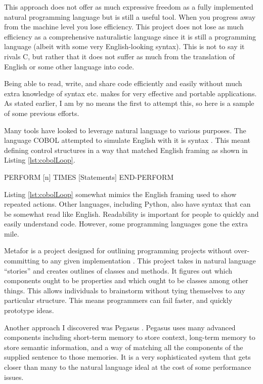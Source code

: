 \documentclass[titlepage]{article}
\newcommand{\lstRef}[1]{Listing \ref{lst:#1}}
\begin{document}
This approach does not offer as much expressive freedom as a fully implemented natural programming language but is still a useful tool. When you progress away from the machine level you lose efficiency. This project does not lose as much efficiency as a comprehensive naturalistic language since it is still a programming language (albeit with some very English-looking syntax). This is not to say it rivals C, but rather that it does not suffer as much from the translation of English or some other language into code.

Being able to read, write, and share code efficiently and easily without much extra knowledge of syntax etc. makes for very effective and portable applications. As stated earlier, I am by no means the first to attempt this, so here is a sample of some previous efforts.

Many tools have looked to leverage natural language to various purposes. The language COBOL attempted to simulate English with it is syntax \cite{Liu2005MetaforVS}. This meant defining control structures in a way that matched English framing as shown in \lstRef{cobolLoop}.

\begin{codeblock}[language=Cobol,caption={Cobol Loop Frame},label={lst:cobolLoop}]
PERFORM [n] TIMES
	[Statements]
END-PERFORM
\end{codeblock}

\lstRef{cobolLoop} somewhat mimics the English framing used to show repeated actions. Other languages, including Python, also have syntax that can be somewhat read like English. Readability is important for people to quickly and easily understand code. However, some programming languages gone the extra mile.

Metafor is a project designed for outlining programming projects without over-committing to any given implementation \cite{Liu2005MetaforVS}. This project takes in natural language “stories” and creates outlines of classes and methods. It figures out which components ought to be properties and which ought to be classes among other things. This allows individuals to brainstorm without tying themselves to any particular structure. This means programmers can fail faster, and quickly prototype ideas.

Another approach I discovered was Pegasus \cite{Knöll2006PegasusFS}. Pegasus uses many advanced components including short-term memory to store context, long-term memory to store semantic information, and a way of matching all the components of the supplied sentence to those memories. It is a very sophisticated system that gets closer than many to the natural language ideal at the cost of some performance issues.
\end{document}
